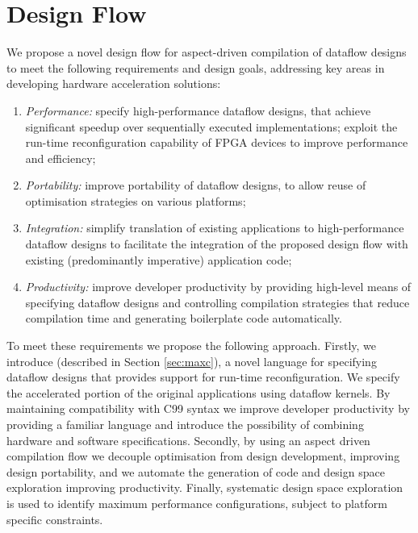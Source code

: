 \section{Design Flow}
\label{sec:design-flow}

We propose a novel design flow for aspect-driven compilation of
dataflow designs to meet the following requirements and design goals,
addressing key areas in developing hardware acceleration solutions:
\begin{enumerate}
\item \emph{Performance:} specify high-performance dataflow designs,
  that achieve significant speedup over sequentially executed
  implementations; exploit the run-time reconfiguration capability of
  FPGA devices to improve performance and efficiency;
\item \emph{Portability:} improve portability of dataflow designs, to
  allow reuse of optimisation strategies on various platforms;
\item \emph{Integration:} simplify translation of existing
  applications to high-performance dataflow designs to facilitate the
  integration of the proposed design flow with existing (predominantly
  imperative) application code;
\item \emph{Productivity:} improve developer productivity by providing
  high-level means of specifying dataflow designs and controlling
  compilation strategies that reduce compilation time and generating
  boilerplate code automatically.
\end{enumerate}

To meet these requirements we propose the following approach. Firstly,
we introduce \MAXC{} (described in Section \ref{sec:maxc}), a novel
language for specifying dataflow designs that provides support for
run-time reconfiguration. We specify the accelerated portion of the
original applications using \MAXC{} dataflow kernels. By maintaining
compatibility with C99 syntax we improve developer productivity by
providing a familiar language and introduce the possibility of
combining hardware and software specifications. Secondly, by using an
aspect driven compilation flow we decouple optimisation from design
development, improving design portability, and we automate the
generation of code and design space exploration improving
productivity. Finally, systematic design space exploration is used to
identify maximum performance configurations, subject to platform
specific constraints.

